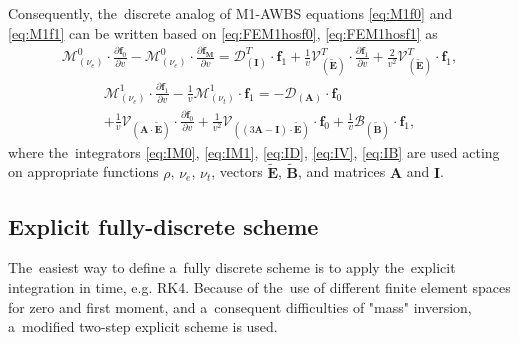 \documentclass[preprint,12pt]{elsarticle}
\newcommand{\pdv}[2]{\frac{\partial{#1}}{\partial{#2}}}
\newcommand{\vect}[1]{\boldsymbol{#1}}
\newcommand{\matr}[1]{\mathbf{#1}}
\newcommand{\nue}{\nu_{e}}
\newcommand{\nutot}{\nu_{t}}
\newcommand{\vmag}{v}
\newcommand{\tE}{\vect{\tilde{E}}}
\newcommand{\tB}{\vect{\tilde{B}}}
\newcommand{\fM}{f_M}
\newcommand{\vfzero}{\vect{f}_0}
\newcommand{\fone}{\vect{f}_1}
\newcommand{\MI}{\matr{I}}
\newcommand{\MA}{\matr{A}}
\newcommand{\IM}{\boldsymbol{\mathcal{M}}}
\newcommand{\ID}{\boldsymbol{\mathcal{D}}}
\newcommand{\IV}{\boldsymbol{\mathcal{V}}}
\newcommand{\IB}{\boldsymbol{\mathcal{B}}}
\begin{document}
Consequently, the~discrete analog of M1-AWBS equations
\eqref{eq:M1f0} and \eqref{eq:M1f1} can be written based on 
 \eqref{eq:FEM1hosf0}, \eqref{eq:FEM1hosf1} as
\begin{multline}
  \IM^0_{(\nue)} \cdot \pdv{\vfzero}{\vmag} 
  - \IM^0_{(\nue)} \cdot \pdv{\vect{\fM}}{\vmag}
  = 
  \ID^T_{\left(\MI\right)} \cdot \fone
  + \frac{1}{\vmag}\IV^T_{\left(\tE\right)} \cdot 
  \pdv{\fone}{\vmag} 
  + \frac{2}{\vmag^2}\IV^T_{\left(\tE\right)} \cdot \fone ,  
  \label{eq:semiM1hosf0}
\end{multline}
\begin{multline}
  \IM^1_{(\nue)} \cdot \pdv{\fone}{\vmag} 
  - \frac{1}{\vmag}\IM^1_{\left( \nutot \right)} 
  \cdot \fone 
  = 
  - \ID_{\left(\MA\right)}\cdot \vfzero \\ 
  + \frac{1}{\vmag}\IV_{\left(\MA \cdot \tE\right)} \cdot
  \pdv{\vfzero}{\vmag}
  + \frac{1}{\vmag^2}\IV_{\left(\left( 3\MA - \MI \right) \cdot \tE \right)} 
  \cdot \vfzero
  + \frac{1}{\vmag}\IB_{\left( \tB \right)} \cdot \fone ,
  \label{eq:semiM1hosf1}
\end{multline}
where the~integrators \eqref{eq:IM0}, \eqref{eq:IM1},
\eqref{eq:ID}, \eqref{eq:IV}, \eqref{eq:IB} are used acting on appropriate
functions $\rho$, $\nue$, $\nutot$, vectors $\tE$, $\tB$, and matrices $\MA$
and $\MI$.



\subsection{Explicit fully-discrete scheme}\label{sec:expl_fullydiscrete_scheme}
The~easiest way to define a~fully discrete scheme is to apply the~explicit
integration in time, e.g. RK4.
Because of the~use of different finite element spaces for zero and first moment,
and a~consequent difficulties of "mass" inversion, a~modified two-step explicit
scheme is used.
\end{document}
